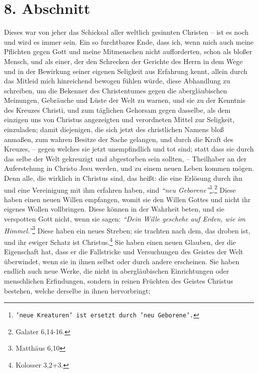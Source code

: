 \section{8. Abschnitt} \label{kap1_ab8}

Dieses war von jeher das Schicksal aller weltlich gesinnten Christen -- ist es
noch und wird es immer sein.
Ein so furchtbares Ende, dass ich, wenn mich auch meine Pflichten gegen Gott und
meine Mitmenschen nicht aufforderten, schon als bloßer Mensch, und als einer,
der den Schrecken der Gerichte des Herrn in dem Wege und in der Bewirkung seiner
eigenen Seligkeit aus Erfahrung kennt, allein durch das Mitleid mich hinreichend
bewogen fühlen würde, diese Abhandlung zu schreiben, um die Bekenner des
Christentumes gegen die abergläubischen Meinungen, Gebräuche und Lüste der Welt
zu warnen, und sie zu der Kenntnis des Kreuzes Christi, und zum täglichen
Gehorsam gegen dasselbe, als dem einzigen uns von Christus angezeigten und
verordneten Mittel zur Seligkeit, einzuladen;
damit diejenigen, die sich jetzt des christlichen Namens bloß anmaßen, zum
wahren Besitze der Sache gelangen, und durch die Kraft des Kreuzes,
-- gegen welches sie jetzt unempfindlich und tot sind;
statt dass sie durch das selbe der Welt gekreuzigt und abgestorben sein sollten,
-- Theilhaber an der Auferstehung in Christo Jesu werden, und zu einem neuen
Leben kommen mögen.
Denn alle, die wirklich in Christus sind, das heißt:
die eine Erlösung durch ihn und eine Vereinigung mit ihm erfahren haben, sind
\textit{"`neu Geborene"'}\footnote{\texttt{'neue Kreaturen' ist ersetzt durch 'neu Geborene'.}}.\footnote{Galater 6,14-16.}
Diese haben einen neuen Willen empfangen, womit sie den Willen Gottes und nicht
ihr eigenes Wollen vollbringen.
Diese können in der Wahrheit beten, und sie verspotten Gott nicht, wenn sie
sagen:
\textit{"`Dein Wille geschehe auf Erden, wie im Himmel."'}\footnote{Matthäus 6,10}
Diese haben ein neues Streben;
sie trachten nach dem, das droben ist, und ihr ewiger Schatz ist
Christus.\footnote{Kolosser 3,2+3.}
Sie haben einen neuen Glauben, der die Eigenschaft hat, dass er die Fallstricke
und Versuchungen des Geistes der Welt überwindet, wenn sie in ihnen selbst oder
durch andere erscheinen.
Sie haben endlich auch neue Werke, die nicht in abergläubischen Einrichtungen
oder menschlichen Erfindungen, sondern in reinen Früchten des Geistes Christus
 bestehen, welche derselbe in ihnen hervorbringt;
